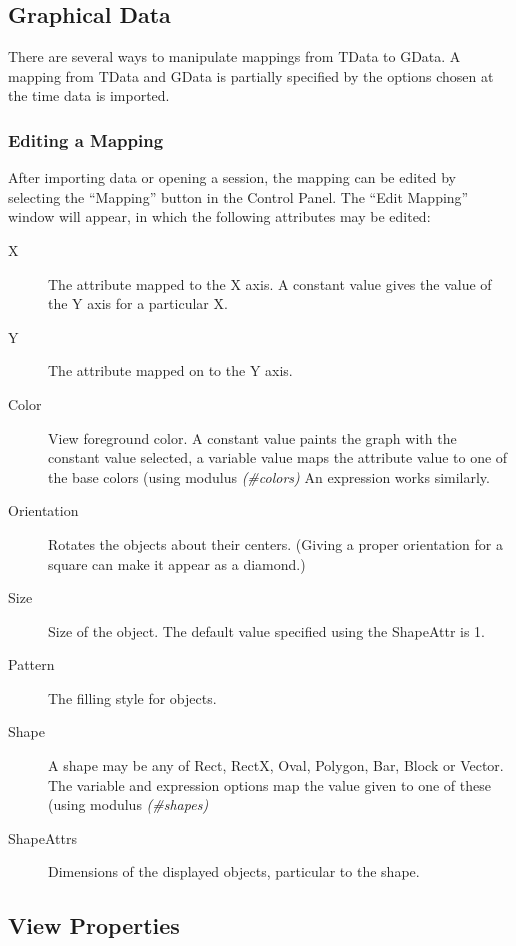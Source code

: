 \subsection{Graphical Data}

There are several ways to manipulate mappings from TData to GData. A mapping
from TData and GData is partially specified by the options chosen at the time
data is imported.

\subsubsection{Editing a Mapping}

After importing data or opening a session, the mapping can be edited by
selecting the ``Mapping'' button in the Control Panel. The ``Edit Mapping''
window will appear, in which the following attributes may be edited:

\begin{description}
	\item[X] The attribute mapped to the X axis. A constant value gives the
		value of the Y axis for a particular X.
	\item[Y] The attribute mapped on to the Y axis.
	\item[Color] View foreground color. A constant value paints the graph with
		the constant value selected, a variable value maps the attribute value
		to one of the base colors (using modulus {\em (\#colors)} An expression
		works similarly.
	\item[Orientation] Rotates the objects about their centers. (Giving a
		proper orientation for a square can make it appear as a diamond.)
	\item[Size] Size of the object. The default value specified using the
		ShapeAttr is 1.
	\item[Pattern] The filling style for objects.
	\item[Shape] A shape may be any of Rect, RectX, Oval, Polygon, Bar, Block
		or Vector. The variable and expression options map the value
		given to one of these (using modulus {\em (\#shapes)}
	\item[ShapeAttrs] Dimensions of the displayed objects, particular to the
		shape.
\end{description}


\subsection{View Properties}

